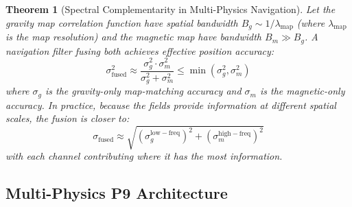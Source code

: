 \documentclass[11pt]{article}
\newtheorem{theorem}{Theorem}[section]
\theoremstyle{definition}
\theoremstyle{remark}
\begin{document}
\begin{theorem}[Spectral Complementarity in Multi-Physics Navigation]
\label{thm:spectral-complement}
Let the gravity map correlation function have spatial bandwidth
$B_g \sim 1/\lambda_{\mathrm{map}}$ (where $\lambda_{\mathrm{map}}$ is
the map resolution) and the magnetic map have bandwidth $B_m \gg B_g$.
A navigation filter fusing both achieves effective position accuracy:
\begin{equation}
\sigma_{\mathrm{fused}}^2 \approx
\frac{\sigma_g^2 \cdot \sigma_m^2}{\sigma_g^2 + \sigma_m^2}
\leq \min(\sigma_g^2, \sigma_m^2)
\label{eq:fusion-accuracy}
\end{equation}
where $\sigma_g$ is the gravity-only map-matching accuracy and
$\sigma_m$ is the magnetic-only accuracy. In practice, because
the fields provide information at \emph{different spatial scales},
the fusion is closer to:
\begin{equation}
\sigma_{\mathrm{fused}} \approx
\sqrt{(\sigma_g^{\mathrm{low-freq}})^2 +
(\sigma_m^{\mathrm{high-freq}})^2}
\label{eq:fusion-spectral}
\end{equation}
with each channel contributing where it has the most information.
\end{theorem}

\subsection{Multi-Physics P9 Architecture}
\end{document}
